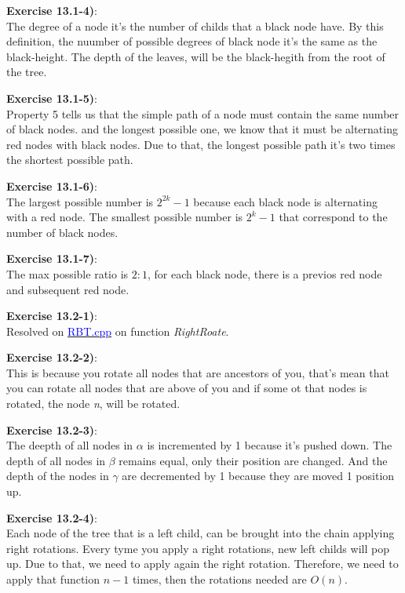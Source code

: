 \documentclass{article}
\newcounter{exercise}[section]   %
\begin{document}
\textbf{Exercise 13.1-4)}:\\
The degree of a node it's the number of childs that a black node have. By this definition,
the nuumber of possible degrees of black node it's the same as the black-height. The depth
of the leaves, will be the black-hegith from the root of the tree. 

\textbf{Exercise 13.1-5)}:\\
Property 5 tells us that the simple path of a node must contain the same number of black nodes.
and the longest possible one, we know that it must be alternating red nodes with black nodes.
Due to that, the longest possible path it's two times the shortest possible path.

\textbf{Exercise 13.1-6)}:\\
The largest possible number is \(2^{2k} - 1\) because each black node is alternating with
a red node. The smallest possible number is \(2^k - 1\) that correspond to the number of black nodes.

\textbf{Exercise 13.1-7)}:\\
The max possible ratio is \(2:1\), for each black node, there is a previos red node and 
subsequent red node.

\textbf{Exercise 13.2-1)}:\\
Resolved on \href{https://github.com/Graburr/Algorithms_CLRS_4ed_solutions/tree/main/chapter3/Red_Black_Trees/RBT.cpp}
{\textcolor{Blue}{RBT.cpp}} on function \textit{RightRoate}.

\textbf{Exercise 13.2-2)}:\\
This is because you rotate all nodes that are ancestors of you, that's mean that you can rotate
all nodes that are above of you and if some ot that nodes is rotated, the node \textit{n},
will be rotated.

\textbf{Exercise 13.2-3)}:\\
The deepth of all nodes in \(\alpha\) is incremented by 1 because it's pushed down. The 
depth of all nodes in \(\beta\) remains equal, only their position are changed. And the 
depth of the nodes in \(\gamma\) are decremented by 1 because they are moved 1 position up.

\textbf{Exercise 13.2-4)}:\\
Each node of the tree that is a left child, can be brought into the chain applying right
rotations. Every tyme you apply a right rotations, new left childs will pop up. Due to that,
we need to apply again the right rotation. Therefore, we need to apply that function \(n - 1\)
times, then the rotations needed are \(O(n)\).
\end{document}
